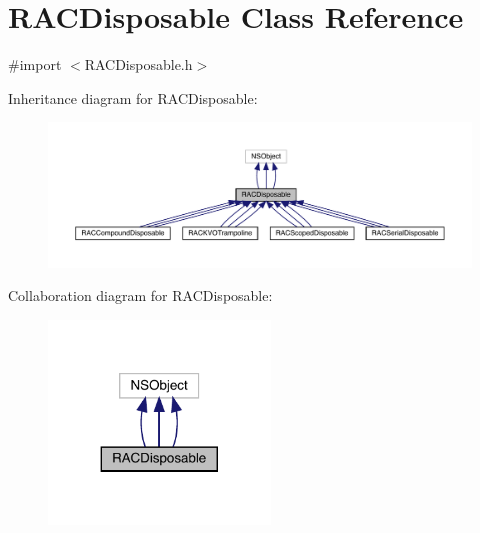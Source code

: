 \hypertarget{interface_r_a_c_disposable}{}\section{R\+A\+C\+Disposable Class Reference}
\label{interface_r_a_c_disposable}


{\ttfamily \#import $<$R\+A\+C\+Disposable.\+h$>$}



Inheritance diagram for R\+A\+C\+Disposable\+:\nopagebreak
\begin{figure}[H]
\begin{center}
\leavevmode
\includegraphics[width=350pt]{interface_r_a_c_disposable__inherit__graph}
\end{center}
\end{figure}


Collaboration diagram for R\+A\+C\+Disposable\+:\nopagebreak
\begin{figure}[H]
\begin{center}
\leavevmode
\includegraphics[width=167pt]{interface_r_a_c_disposable__coll__graph}
\end{center}
\end{figure}
